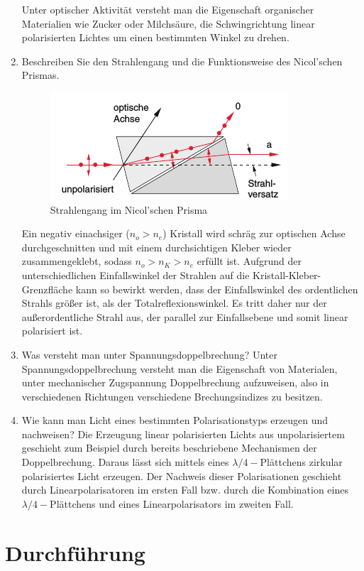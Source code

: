 \begin{enumerate}
		\subitem Unter optischer Aktivität versteht man die Eigenschaft organischer Materialien wie Zucker oder Milchsäure, die Schwingrichtung linear polarisierten Lichtes um einen bestimmten Winkel zu drehen.
	\item Beschreiben Sie den Strahlengang und die Funktionsweise des Nicol'schen Prismas.
		\subitem \begin{figure}[!h]
			\centering
			\includegraphics{nicol}
			\caption{Strahlengang im Nicol'schen Prisma}
			\label{fig:Abb7}
		\end{figure}
		Ein negativ einachsiger ($n_o>n_e$) Kristall wird schräg zur optischen Achse durchgeschnitten und mit einem durchsichtigen Kleber wieder zusammengeklebt, sodass $n_o>n_K>n_e$ erfüllt ist. Aufgrund der unterschiedlichen Einfallswinkel der Strahlen auf die Kristall-Kleber-Grenzfläche kann so bewirkt werden, dass der Einfallswinkel des ordentlichen Strahls größer ist, als der Totalreflexionswinkel. Es tritt daher nur der außerordentliche Strahl aus, der parallel zur Einfallsebene und somit linear polarisiert ist.
	\item Was versteht man unter Spannungsdoppelbrechung?
		\subitem Unter Spannungsdoppelbrechung versteht man die Eigenschaft von Materialen, unter mechanischer Zugspannung Doppelbrechung aufzuweisen, also in verschiedenen Richtungen verschiedene Brechungsindizes zu besitzen.
	\item Wie kann man Licht eines bestimmten Polarisationstyps erzeugen und nachweisen?
		\subitem Die Erzeugung linear polarisierten Lichts aus unpolarisiertem geschieht zum Beispiel durch bereits beschriebene Mechanismen der Doppelbrechung. Daraus lässt sich mittels eines $\lambda/4-$Plättchens zirkular polarisiertes Licht erzeugen. Der Nachweis dieser Polarisationen geschieht durch Linearpolarisatoren im ersten Fall bzw. durch die Kombination eines $\lambda/4-$Plättchens und eines Linearpolarisators im zweiten Fall.
\end{enumerate}
\section{Durchführung}
